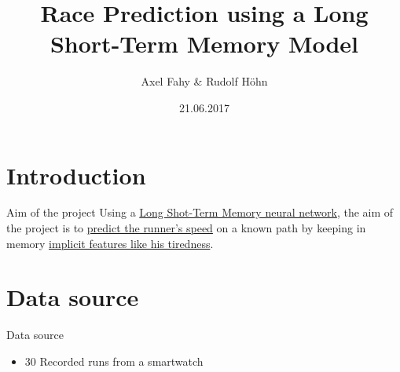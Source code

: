 \documentclass[aspectratio=169]{beamer}
\title{Race Prediction using a Long Short-Term Memory Model}
\author{Axel Fahy \& Rudolf Höhn}
\institute{Machine Learning on Big Data\\MSE\\\href{https://github.com/axelfahy/RacePrediction}{GitHub repository}}
\date{21.06.2017}
\begin{document}

\begin{frame}
\titlepage
\end{frame}



\section{Introduction}

\begin{frame}{Aim of the project}
		Using a \underline{Long Shot-Term Memory neural network}, the aim of the project is to \underline{predict the runner's speed} on a known path by keeping in memory \underline{implicit features like his tiredness}.
\end{frame}

\section{Data source}

\begin{frame}{Data source}
    \begin{itemize}
        \item 30 Recorded runs from a smartwatch
    \end{itemize}
\end{frame}

\end{document}
